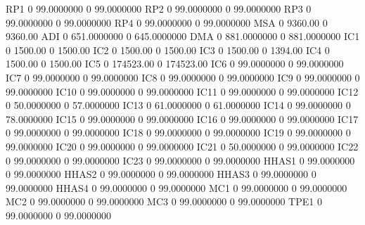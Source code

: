 \documentclass[
  11pt,
  a4paper,
  DIV=12,captions=tableheading,oneside,titlepage]{scrbook}
\let\oldverbatim\verbatim
\let\endoldverbatim\endverbatim
\renewenvironment{verbatim}{\footnotesize\oldverbatim}{\endoldverbatim}
\begin{document}
\begin{verbatim}
  RP1                    0    99.0000000             0    99.0000000 
  RP2                    0    99.0000000             0    99.0000000 
  RP3                    0    99.0000000             0    99.0000000 
  RP4                    0    99.0000000             0    99.0000000 
  MSA                    0       9360.00             0       9360.00 
  ADI                    0   651.0000000             0   645.0000000 
  DMA                    0   881.0000000             0   881.0000000 
  IC1                    0       1500.00             0       1500.00 
  IC2                    0       1500.00             0       1500.00 
  IC3                    0       1500.00             0       1394.00 
  IC4                    0       1500.00             0       1500.00 
  IC5                    0     174523.00             0     174523.00 
  IC6                    0    99.0000000             0    99.0000000 
  IC7                    0    99.0000000             0    99.0000000 
  IC8                    0    99.0000000             0    99.0000000 
  IC9                    0    99.0000000             0    99.0000000 
  IC10                   0    99.0000000             0    99.0000000 
  IC11                   0    99.0000000             0    99.0000000 
  IC12                   0    50.0000000             0    57.0000000 
  IC13                   0    61.0000000             0    61.0000000 
  IC14                   0    99.0000000             0    78.0000000 
  IC15                   0    99.0000000             0    99.0000000 
  IC16                   0    99.0000000             0    99.0000000 
  IC17                   0    99.0000000             0    99.0000000 
  IC18                   0    99.0000000             0    99.0000000 
  IC19                   0    99.0000000             0    99.0000000 
  IC20                   0    99.0000000             0    99.0000000 
  IC21                   0    50.0000000             0    99.0000000 
  IC22                   0    99.0000000             0    99.0000000 
  IC23                   0    99.0000000             0    99.0000000 
  HHAS1                  0    99.0000000             0    99.0000000 
  HHAS2                  0    99.0000000             0    99.0000000 
  HHAS3                  0    99.0000000             0    99.0000000 
  HHAS4                  0    99.0000000             0    99.0000000 
  MC1                    0    99.0000000             0    99.0000000 
  MC2                    0    99.0000000             0    99.0000000 
  MC3                    0    99.0000000             0    99.0000000 
  TPE1                   0    99.0000000             0    99.0000000 

\end{verbatim}
\end{document}
